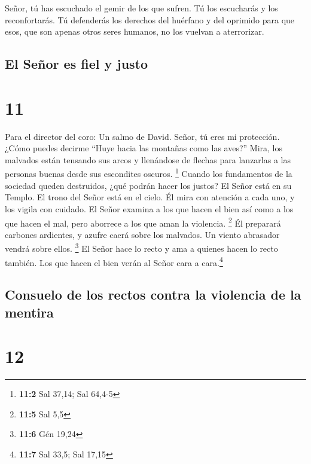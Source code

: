  Señor, tú has escuchado el gemir de los que sufren. Tú
los escucharás y los reconfortarás.  Tú defenderás los
derechos del huérfano y del oprimido para que esos, que son apenas otros
seres humanos, no los vuelvan a aterrorizar.

\hypertarget{el-seuxf1or-es-fiel-y-justo}{%
\subsection{El Señor es fiel y
justo}\label{el-seuxf1or-es-fiel-y-justo}}

\hypertarget{section-10}{%
\section{11}\label{section-10}}

Para el director del coro: Un salmo de David.  Señor, tú
eres mi protección. ¿Cómo puedes decirme ``Huye hacia las montañas como
las aves?''  Mira, los malvados están tensando sus arcos y
llenándose de flechas para lanzarlas a las personas buenas desde sus
escondites oscuros. \footnote{\textbf{11:2} Sal 37,14; Sal 64,4-5}
 Cuando los fundamentos de la sociedad queden destruidos,
¿qué podrán hacer los justos?  El Señor está en su Templo.
El trono del Señor está en el cielo. Él mira con atención a cada uno, y
los vigila con cuidado.  El Señor examina a los que hacen
el bien así como a los que hacen el mal, pero aborrece a los que aman la
violencia. \footnote{\textbf{11:5} Sal 5,5}  Él preparará
carbones ardientes, y azufre caerá sobre los malvados. Un viento
abrasador vendrá sobre ellos. \footnote{\textbf{11:6} Gén 19,24}
 El Señor hace lo recto y ama a quienes hacen lo recto
también. Los que hacen el bien verán al Señor cara a cara.\footnote{\textbf{11:7}
  Sal 33,5; Sal 17,15}

\hypertarget{consuelo-de-los-rectos-contra-la-violencia-de-la-mentira}{%
\subsection{Consuelo de los rectos contra la violencia de la
mentira}\label{consuelo-de-los-rectos-contra-la-violencia-de-la-mentira}}

\hypertarget{section-11}{%
\section{12}\label{section-11}}

